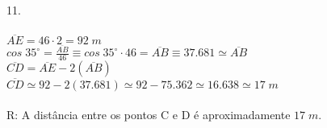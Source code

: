 \documentclass[12pt]{article}
\begin{document}
11.\\\\
$\overline{AE}=46\cdot2=92\;m$\\
$cos\;35^{\circ}=\frac{\overline{AB}}{46}\equiv cos\;35^{\circ}\cdot46=\overline{AB}\equiv37.681\simeq\overline{AB}$\\
$\overline{CD}=\overline{AE}-2(\overline{AB})$\\
$\overline{CD}\simeq92-2(37.681)\simeq92-75.362\simeq16.638\simeq17\;m$\\\\
R: A distância entre os pontos C e D é aproximadamente $17\;m$.\\
\end{document}
